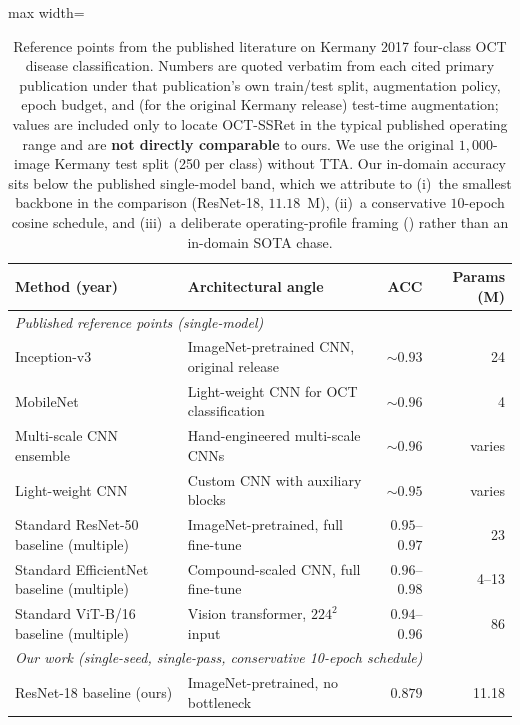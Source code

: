\documentclass[5p]{elsarticle}
\begin{document}
\begin{table}[t]
\centering\small
\caption{Reference points from the published literature on Kermany 2017 four-class OCT disease classification. Numbers are quoted verbatim from each cited primary publication under that publication's own train/test split, augmentation policy, epoch budget, and (for the original Kermany release) test-time augmentation; values are included only to locate OCT-SSRet in the typical published operating range and are \textbf{not directly comparable} to ours. We use the original $1{,}000$-image Kermany test split (250 per class) without TTA. Our in-domain accuracy sits below the published single-model band, which we attribute to (i)~the smallest backbone in the comparison (ResNet-18, $11.18$~M), (ii)~a conservative $10$-epoch cosine schedule, and (iii)~a deliberate operating-profile framing () rather than an in-domain SOTA chase.}
\label{tab:lit}
\setlength{\tabcolsep}{4pt}
\begin{adjustbox}{max width=\columnwidth}
\begin{tabular}{llrr}
\toprule
Method (year) & Architectural angle & ACC & Params (M) \\
\midrule
\multicolumn{4}{l}{\emph{Published reference points (single-model)}} \\
Inception-v3~\citep{kermany2018identifying} & ImageNet-pretrained CNN, original release & $\sim 0.93$ & 24 \\
MobileNet~\citep{lu2018deep} & Light-weight CNN for OCT classification & $\sim 0.96$ & 4 \\
Multi-scale CNN ensemble~\citep{rasti2018macular} & Hand-engineered multi-scale CNNs & $\sim 0.96$ & varies \\
Light-weight CNN~\citep{li2019deep} & Custom CNN with auxiliary blocks & $\sim 0.95$ & varies \\
Standard ResNet-50 baseline (multiple) & ImageNet-pretrained, full fine-tune & $0.95$--$0.97$ & 23 \\
Standard EfficientNet baseline (multiple) & Compound-scaled CNN, full fine-tune & $0.96$--$0.98$ & 4--13 \\
Standard ViT-B/16 baseline (multiple) & Vision transformer, $224^2$ input & $0.94$--$0.96$ & 86 \\
\midrule
\multicolumn{4}{l}{\emph{Our work (single-seed, single-pass, conservative 10-epoch schedule)}} \\
ResNet-18 baseline (ours)               & ImageNet-pretrained, no bottleneck             & $0.879$ & 11.18 \\

\end{tabular}
\end{adjustbox}
\end{table}
\end{document}
